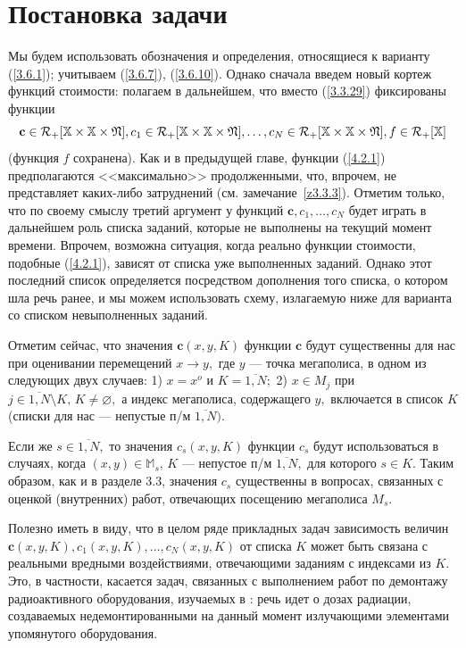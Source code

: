 \documentclass[11pt,twoside,openany]{report}
\newcommand{\bfn}{\begin{equation}}
\newcommand{\efn}{\end{equation}}
\newcommand{\ov}{\overline}
\newcommand{\sm}{\setminus}
\newcommand{\car}{{\cal R}}
\newcommand{\bbm}{{\mathbb M}}
\newcommand{\bbx}{{\mathbb X}}
\newcommand{\emp}{\varnothing}
\begin{document}
{{\raggedright\section{
  Постановка задачи
}}
\label{sect:4.2}
\setcounter{equation}{0}

Мы будем использовать обозначения и определения, относящиеся к варианту
(\ref{3.6.1}); учитываем (\ref{3.6.7}), (\ref{3.6.10}). Однако сначала введем
новый кортеж функций стоимости: полагаем в дальнейшем, что вместо (\ref{3.3.29})
фиксированы функции
\bfn\label{4.2.1}
\mathbf{c}\in \car_+[\bbx\times \bbx\times \mathfrak{N}], c_1\in \car_+
[\bbx\times \bbx\times \mathfrak{N}],\ldots,c_N\in \car_+[\bbx\times
\bbx\times \mathfrak{N}], f\in \car_+[\bbx]
\efn
(функция $f$ сохранена). Как и в предыдущей главе, функции (\ref{4.2.1})
предполагаются <<максимально>> продолженными, что, впрочем, не представляет
каких-либо затруднений (см. замечание~\ref{z3.3.3}). Отметим только, что по
своему смыслу третий аргумент у функций $\mathbf{c}, c_1,\ldots,c_N$ будет
играть в дальнейшем роль списка заданий, которые  не выполнены на текущий
момент времени. Впрочем, возможна ситуация, когда реально функции стоимости,
подобные (\ref{4.2.1}), зависят  от списка уже выполненных заданий. Однако
этот последний список определяется посредством дополнения того списка, о
котором шла речь ранее, и мы можем использовать схему, излагаемую ниже для
варианта со списком невыполненных заданий.

Отметим сейчас, что значения $\mathbf{c}(x,y,K)$ функции $\mathbf{c}$ будут
существенны для нас при оценивании перемещений $x\rightarrow y,$ где $y$ ---
точка мегаполиса, в одном из следующих двух случаев: 1) $x= x^o$ и $K =
\ov{1,N};$ 2) $x\in M_j$ при $j\in \ov{1,N}\sm K,\, K\neq \emp,$ а индекс
мегаполиса, содержащего $y,$ включается в список $K$ (списки для нас ---
непустые п/м $\ov{1,N}).$

Если же $s\in \ov{1,N},$ то значения $c_s(x,y,K)$ функции $c_s$ будут
использоваться в случаях, когда $(x,y)\in \bbm_s,\, K$ --- непустое п/м
$\ov{1,N},$ для которого $s\in K.$ Таким образом, как и в разделе 3.3,
значения $c_s$ существенны в вопросах, связанных с оценкой (внутренних)
работ, отвечающих посещению мегаполиса $M_s.$

Полезно иметь в виду, что в целом ряде прикладных задач зависимость
величин $\mathbf{c}(x,y,K), c_1(x,y,K),\ldots,c_N(x,y,K)$ от списка $K$
может быть связана с реальными вредными воздействиями, отвечающими заданиям
с индексами из $K.$ Это, в частности, касается задач, связанных с выполнением
работ по демонтажу радиоактивного оборудования, изучаемых в \cite{Cha2`}:
речь идет о дозах радиации, создаваемых недемонтированными на данный момент
излучающими элементами упомянутого оборудования.

}
\end{document}
